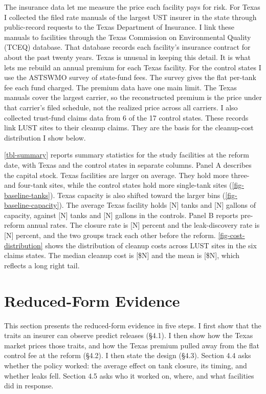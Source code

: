 \documentclass[
  12pt,
]{article}
\begin{document}
The insurance data let me measure the price each facility pays for risk.
For Texas I collected the filed rate manuals of the largest UST insurer
in the state through public-record requests to the Texas Department of
Insurance. I link these manuals to facilities through the Texas
Commission on Environmental Quality (TCEQ) database. That database
records each facility's insurance contract for about the past twenty
years. Texas is unusual in keeping this detail. It is what lets me
rebuild an annual premium for each Texas facility. For the control
states I use the ASTSWMO survey of state-fund fees. The survey gives the
flat per-tank fee each fund charged. The premium data have one main
limit. The Texas manuals cover the largest carrier, so the reconstructed
premium is the price under that carrier's filed schedule, not the
realized price across all carriers. I also collected trust-fund claims
data from 6 of the 17 control states. These records link LUST sites to
their cleanup claims. They are the basis for the cleanup-cost
distribution I show below.

\autoref{tbl-summary} reports summary statistics for the study
facilities at the reform date, with Texas and the control states in
separate columns. Panel A describes the capital stock. Texas facilities
are larger on average. They hold more three- and four-tank sites, while
the control states hold more single-tank sites
(\autoref{fig-baseline-tanks}). Texas capacity is also shifted toward
the larger bins (\autoref{fig-baseline-capacity}). The average Texas
facility holds {[}N{]} tanks and {[}N{]} gallons of capacity, against
{[}N{]} tanks and {[}N{]} gallons in the controls. Panel B reports
pre-reform annual rates. The closure rate is {[}N{]} percent and the
leak-discovery rate is {[}N{]} percent, and the two groups track each
other before the reform. \autoref{fig-cost-distribution} shows the
distribution of cleanup costs across LUST sites in the six claims
states. The median cleanup cost is {[}\$N{]} and the mean is {[}\$N{]},
which reflects a long right tail.

\section{Reduced-Form Evidence}\label{reduced-form-evidence}

This section presents the reduced-form evidence in five steps. I first
show that the traits an insurer can observe predict releases (§4.1). I
then show how the Texas market prices those traits, and how the Texas
premium pulled away from the flat control fee at the reform (§4.2). I
then state the design (§4.3). Section 4.4 asks whether the policy
worked: the average effect on tank closure, its timing, and whether
leaks fell. Section 4.5 asks who it worked on, where, and what
facilities did in response.
\end{document}
